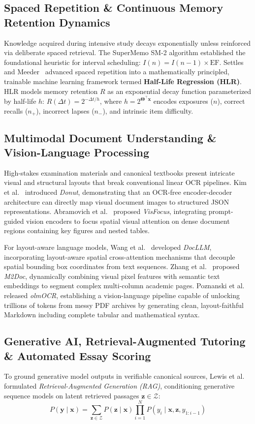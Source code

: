 \documentclass[conference]{IEEEtran}
\begin{document}
\subsection{Spaced Repetition \& Continuous Memory Retention Dynamics}
Knowledge acquired during intensive study decays exponentially unless reinforced via deliberate spaced retrieval. The SuperMemo SM-2 algorithm \cite{Wozniak1990} established the foundational heuristic for interval scheduling: $I(n) = I(n-1) \times \text{EF}$. Settles and Meeder~\cite{SettlesMeeder2016} advanced spaced repetition into a mathematically principled, trainable machine learning framework termed \textbf{Half-Life Regression (HLR)}. HLR models memory retention $R$ as an exponential decay function parameterized by half-life $h$: $R(\Delta t) = 2^{-\Delta t / h}$, where $h = 2^{\boldsymbol{\Theta}^\top \mathbf{x}}$ encodes exposures ($n$), correct recalls ($n_+$), incorrect lapses ($n_-$), and intrinsic item difficulty.

\subsection{Multimodal Document Understanding \& Vision-Language Processing}
High-stakes examination materials and canonical textbooks present intricate visual and structural layouts that break conventional linear OCR pipelines. Kim et al.~\cite{Kim2022} introduced \textit{Donut}, demonstrating that an OCR-free encoder-decoder architecture can directly map visual document images to structured JSON representations. Abramovich et al.~\cite{Abramovich2024} proposed \textit{VisFocus}, integrating prompt-guided vision encoders to focus spatial visual attention on dense document regions containing key figures and nested tables.

For layout-aware language models, Wang et al.~\cite{Wang2024} developed \textit{DocLLM}, incorporating layout-aware spatial cross-attention mechanisms that decouple spatial bounding box coordinates from text sequences. Zhang et al.~\cite{Zhang2024} proposed \textit{M2Doc}, dynamically combining visual pixel features with semantic text embeddings to segment complex multi-column academic pages. Poznanski et al.~\cite{Poznanski2025} released \textit{olmOCR}, establishing a vision-language pipeline capable of unlocking trillions of tokens from messy PDF archives by generating clean, layout-faithful Markdown including complete tabular and mathematical syntax.

\subsection{Generative AI, Retrieval-Augmented Tutoring \& Automated Essay Scoring}
To ground generative model outputs in verifiable canonical sources, Lewis et al.~\cite{Lewis2020} formulated \textit{Retrieval-Augmented Generation (RAG)}, conditioning generative sequence models on latent retrieved passages $\mathbf{z} \in \mathcal{Z}$:
\begin{equation}
    P(\mathbf{y} \mid \mathbf{x}) = \sum_{\mathbf{z} \in \mathcal{Z}} P(\mathbf{z} \mid \mathbf{x}) \prod_{i=1}^N P(y_i \mid \mathbf{x}, \mathbf{z}, y_{1:i-1})
    \label{eq:rag_formula}
\end{equation}
\end{document}
